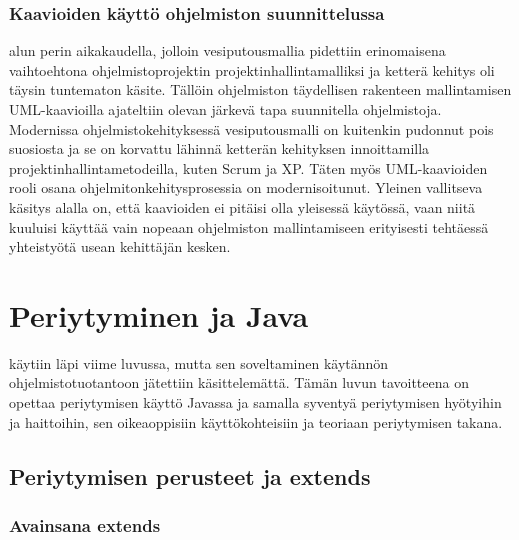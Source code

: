\documentclass[a4paper,justified,notoc]{tufte-book}
\begin{document}
\begin{fullwidth}
\subsection{Kaavioiden käyttö ohjelmiston suunnittelussa}
\label{UMLkäyttö}

 alun perin aikakaudella, jolloin vesiputousmallia pidettiin
erinomaisena vaihtoehtona ohjelmistoprojektin projektinhallintamalliksi ja ketterä kehitys oli
täysin tuntematon käsite. Tällöin ohjelmiston täydellisen rakenteen mallintamisen UML-kaavioilla 
ajateltiin olevan järkevä tapa suunnitella ohjelmistoja. Modernissa ohjelmistokehityksessä
vesiputousmalli on kuitenkin pudonnut pois suosiosta ja se on korvattu lähinnä ketterän kehityksen
innoittamilla projektinhallintametodeilla, kuten Scrum ja XP. Täten myös UML-kaavioiden rooli
osana ohjelmitonkehitysprosessia on modernisoitunut. Yleinen vallitseva käsitys alalla on, että
kaavioiden ei pitäisi olla yleisessä käytössä, vaan niitä kuuluisi käyttää vain nopeaan
ohjelmiston mallintamiseen erityisesti tehtäessä yhteistyötä usean kehittäjän kesken.


\chapter{Periytyminen ja Java}
\label{periytyminen2}

 käytiin läpi viime luvussa, mutta sen soveltaminen
käytännön ohjelmistotuotantoon jätettiin käsittelemättä. Tämän luvun tavoitteena on opettaa
periytymisen käyttö Javassa ja samalla syventyä periytymisen hyötyihin ja haittoihin, sen
oikeaoppisiin käyttökohteisiin ja teoriaan periytymisen takana.


\section{Periytymisen perusteet ja extends}
\label{periytyminen3}

\subsection{Avainsana extends}
\label{extends}


\end{fullwidth}
\end{document}
